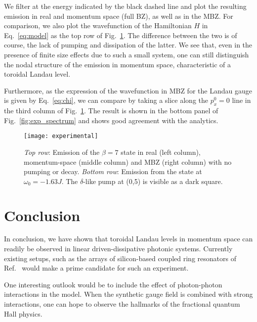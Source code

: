 \documentclass[twocolumn, 10pt, aps, superscriptaddress, floatfix, showpacs, pra, citeautoscript]{revtex4-1}
\newcommand{\co}[2]{#2}
\renewcommand{\paragraph}{\co}
\begin{document}

We filter at the energy indicated by the black dashed line and plot
the resulting emission in real and momentum space (full BZ), as well
as in the MBZ. For comparison, we also plot the wavefunction of the
Hamiltonian $H$ in Eq.~\eqref{eq:model} as the top row of
Fig.~\ref{fig:exp_states}. The difference between the two is of
course, the lack of pumping and dissipation of the latter. We see
that, even in the presence of finite size effects due to such a small
system, one can still distinguish the nodal structure of the emission
in momentum space, characteristic of a toroidal Landau level. 

Furthermore, as the expression of the wavefunction in MBZ for the
Landau gauge is given by Eq.~\eqref{eq:chi}, we can compare by taking
a slice along the $p_x^0 = 0$ line in the third column of
Fig.~\ref{fig:exp_states}. The result is shown in the bottom panel of
Fig.~\ref{fig:exp_spectrum} and shows good agreement with the
analytics.


\begin{figure}[htb]
  \centering
  \texttt{[image: experimental]} %
  \caption{\emph{Top row}: Emission of the $\beta=7$ state in real
    (left column), momentum-space (middle column) and MBZ (right
    column) with no pumping or decay.
    \emph{Bottom row}: Emission from the state at $\omega_0 = -1.63 J$.
    The $\delta$-like pump at (0,5) is visible as a dark square.}

  \label{fig:exp_states}
\end{figure}

\section{Conclusion}
\label{sec:conclusion}


In conclusion, we have shown that toroidal Landau levels in momentum
space can readily be observed in linear driven-dissipative photonic
systems. Currently existing setups, such as the arrays of
silicon-based coupled ring resonators of
Ref.~ would make a prime candidate for
such an experiment.

\paragraph{One possible outlook is to include interactions.}
One interesting outlook would be to include the effect of photon-photon interactions in the model. When the synthetic gauge field is combined with strong interactions, one can hope to observe the hallmarks of the fractional quantum Hall physics.
\end{document}
